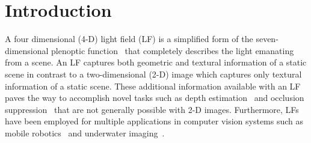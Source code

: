 \section{Introduction}
A four dimensional (4-D) light field (LF) is a simplified form of the seven-dimensional plenoptic function~\cite{Ade1991,Zhan2003} that completely describes the light emanating from a scene. An LF captures both geometric and textural information of a static scene in contrast to a two-dimensional (2-D) image which captures only textural information of a static scene. These additional information available with an LF paves the way to accomplish novel tasks such as depth estimation~\cite{wanner2013variational,tao2013depth,wang2015depth} and occlusion suppression~\cite{vaish2004occlusion,Dan2007,Liyanageocclusion} that are not generally possible with 2-D images. Furthermore, LFs have been employed for multiple applications in computer vision systems such as mobile robotics~\cite{Dong2013,Tsai2017,Baj2018} and underwater imaging~\cite{Piza2013,Dan2014}.



